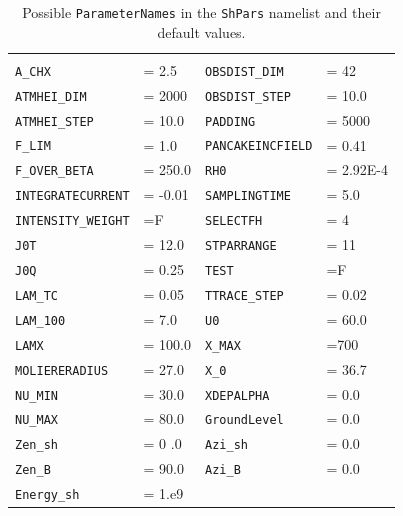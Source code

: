 \documentclass[pdftex,dvipsnames,usenames,fleqn,12pt]{article}
\def\tablab#1{\label{tab:#1}}  %
\begin{document}
\begin{table}[!ht]
\caption{Possible {\tt ParameterNames} in the {\tt ShPars} namelist and their default values. \tablab{ShPars}}
\begin{tabular}{|l l |l l|}
\hline
\\  \verb<A_CHX< & = 2.5                  &    \verb<OBSDIST_DIM< & =      42
\\  \verb<ATMHEI_DIM< & =       2000      &    \verb<OBSDIST_STEP< & =  10.0
\\  \verb<ATMHEI_STEP< & =  10.0          &    \verb<PADDING< & =       5000
\\  \verb<F_LIM< & =  1.0                 &    \verb<PANCAKEINCFIELD< & = 0.41
\\  \verb<F_OVER_BETA< & =  250.0         &    \verb<RH0< & =  2.92E-4
\\  \verb<INTEGRATECURRENT< & = -0.01     &    \verb<SAMPLINGTIME< & = 5.0
\\  \verb<INTENSITY_WEIGHT< & =F          &    \verb<SELECTFH< & =       4
\\  \verb<J0T< & =  12.0                  &    \verb<STPARRANGE< & =   11
\\  \verb<J0Q< & = 0.25                   &    \verb<TEST< & =F
\\  \verb<LAM_TC< & =  0.05               &    \verb<TTRACE_STEP< & =  0.02
\\  \verb<LAM_100< & =  7.0               &    \verb<U0< & =  60.0
\\  \verb<LAMX< & =  100.0                &    \verb<X_MAX< & =700
\\  \verb<MOLIERERADIUS< & =  27.0        &    \verb<X_0< & =  36.7
\\  \verb<NU_MIN< & =  30.0               &    \verb<XDEPALPHA< & =  0.0
\\  \verb<NU_MAX< & =  80.0               &    \verb<GroundLevel< & =  0.0
\\  \verb<Zen_sh< & =  0 .0               &    \verb<Azi_sh< & =  0.0
\\  \verb<Zen_B< & =   90.0               &    \verb<Azi_B< & =  0.0
\\  \verb<Energy_sh< & =  1.e9            &    & \\
\hline
\end{tabular}
\end{table}
\end{document}
